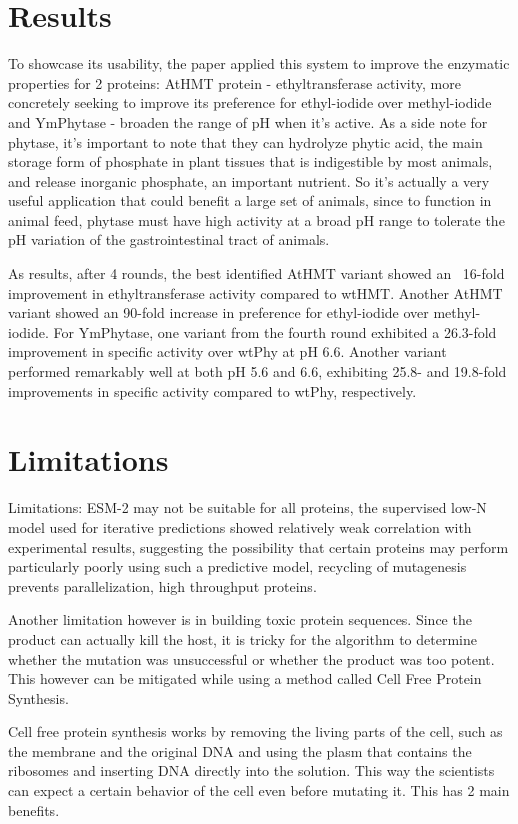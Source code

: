 \documentclass[10pt,a4paper]{article}
\begin{document}
	\section{Results}
	To showcase its usability, the paper applied this system to improve the enzymatic properties for 2 proteins: AtHMT protein - ethyltransferase activity, more concretely seeking to improve its preference for ethyl-iodide over methyl-iodide and YmPhytase - broaden the range of pH when it's active. As a side note for phytase, it's important to note that they can hydrolyze phytic acid, the main storage form of phosphate in plant tissues that is indigestible by most animals, and release inorganic phosphate, an important nutrient. So it's actually a very useful application that could benefit a large set of animals, since to function in animal feed, phytase must have high activity at a broad pH range to tolerate the pH variation of the gastrointestinal tract of animals.
	
	As results, after 4 rounds, the best identified AtHMT variant showed an ~16-fold improvement in ethyltransferase activity compared to wtHMT. Another AtHMT variant showed an 90-fold increase in preference for ethyl-iodide over methyl-iodide. 
	For YmPhytase, one variant from the fourth round exhibited a 26.3-fold improvement in specific activity over wtPhy at pH 6.6. Another variant performed remarkably well at both pH 5.6 and 6.6, exhibiting 25.8- and 19.8-fold improvements in specific activity compared to wtPhy, respectively.
	
	\section{Limitations}
	Limitations: ESM-2 may not be suitable for all proteins, the supervised low-N model used for iterative predictions showed relatively weak correlation with experimental results, suggesting the possibility that certain proteins may perform particularly poorly using such a predictive model, recycling of mutagenesis prevents parallelization, high throughput proteins.
	
	Another limitation however is in building toxic protein sequences. Since the product can actually kill the host, it is tricky for the algorithm to determine whether the mutation was unsuccessful or whether the product was too potent. This however can be mitigated while using a method called Cell Free Protein Synthesis. 
	
	Cell free protein synthesis works by removing the living parts of the cell, such as the membrane and the original DNA and using the plasm that contains the ribosomes and inserting DNA directly into the solution. This way the scientists can expect a certain behavior of the cell even before mutating it. This has 2 main benefits. 
	
\end{document}

